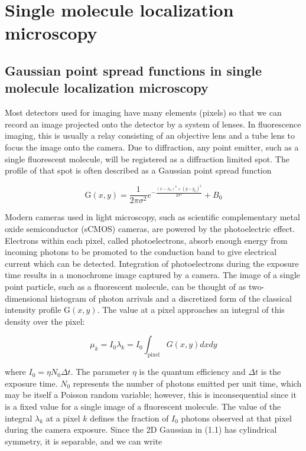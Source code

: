 \documentclass{ucetd}
\begin{document}
\clearpage

\mainmatter

\chapter{Single molecule localization microscopy}

\section{Gaussian point spread functions in single molecule localization microscopy}

Most detectors used for imaging have many elements (pixels) so that we can record an image projected onto the detector by a system of lenses. In fluorescence imaging, this is usually a relay consisting of an objective lens and a tube lens to focus the image onto the camera. Due to diffraction, any point emitter, such as a single fluorescent molecule, will be registered as a diffraction limited spot. The profile of that spot is often described as a Gaussian point spread function

\begin{equation}
\mathrm{G}(x,y) = \frac{1}{2\pi\sigma^{2}}e^{-\frac{(x-x_{0})^{2}+(y-y_{0})^{2}}{2\sigma^{2}}} + B_0
\end{equation}


Modern cameras used in light microscopy, such as scientific complementary metal oxide semiconductor (sCMOS) cameras, are powered by the photoelectric effect. Electrons within each pixel, called photoelectrons, absorb enough energy from incoming photons to be promoted to the conduction band to give electrical current which can be detected. Integration of photoelectrons during the exposure time results in a monochrome image captured by a camera. The image of a single point particle, such as a fluorescent molecule, can be thought of as two-dimensional histogram of photon arrivals and a discretized form of the classical intensity profile $\mathrm{G}(x,y)$. The value at a pixel approaches an integral of this density over the pixel:

\begin{equation}
\mu_{k} = I_{0}\lambda_{k} = I_{0}\int_{\mathrm{pixel}} G(x,y)dxdy
\end{equation}

where $I_{0} = \eta N_{0}\Delta t$. The parameter $\eta$ is the quantum efficiency and $\Delta t$ is the exposure time. $N_{0}$ represents the number of photons emitted per unit time, which may be itself a Poisson random variable; however, this is inconsequential since it is a fixed value for a single image of a fluorescent molecule. The value of the integral $\lambda_{k}$ at a pixel $k$ defines the fraction of $I_{0}$ photons observed at that pixel during the camera exposure. Since the 2D Gaussian in (1.1) has cylindrical symmetry, it is separable, and we can write
\end{document}
